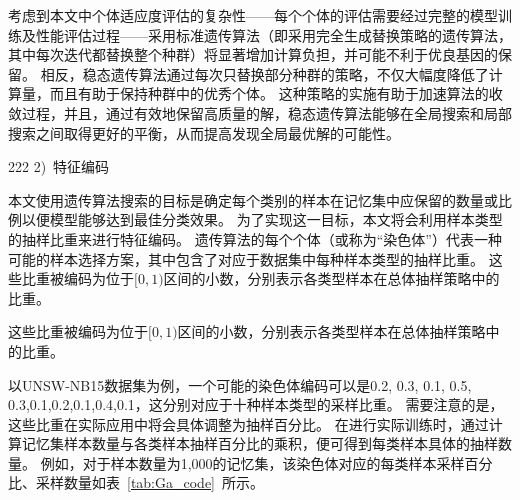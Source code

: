 考虑到本文中个体适应度评估的复杂性——每个个体的评估需要经过完整的模型训练及性能评估过程——采用标准遗传算法（即采用完全生成替换策略的遗传算法，其中每次迭代都替换整个种群）将显著增加计算负担，并可能不利于优良基因的保留。
相反，稳态遗传算法通过每次只替换部分种群的策略，不仅大幅度降低了计算量，而且有助于保持种群中的优秀个体。
这种策略的实施有助于加速算法的收敛过程，并且，通过有效地保留高质量的解，稳态遗传算法能够在全局搜索和局部搜索之间取得更好的平衡，从而提高发现全局最优解的可能性。\par
                                                                                     222
2)~特征编码\par
本文使用遗传算法搜索的目标是确定每个类别的样本在记忆集中应保留的数量或比例以便模型能够达到最佳分类效果。
为了实现这一目标，本文将会利用样本类型的抽样比重来进行特征编码。
遗传算法的每个个体（或称为“染色体”）代表一种可能的样本选择方案，其中包含了对应于数据集中每种样本类型的抽样比重。
这些比重被编码为位于$[0,1)$区间的小数，分别表示各类型样本在总体抽样策略中的比重。\par
这些比重被编码为位于$[0,1)$区间的小数，分别表示各类型样本在总体抽样策略中的比重。\par
以UNSW-NB15数据集为例，一个可能的染色体编码可以是{0.2, 0.3, 0.1, 0.5, 0.3,0.1,0.2,0.1,0.4,0.1}，这分别对应于十种样本类型的采样比重。
需要注意的是，这些比重在实际应用中将会具体调整为抽样百分比。
在进行实际训练时，通过计算记忆集样本数量与各类样本抽样百分比的乘积，便可得到每类样本具体的抽样数量。
例如，对于样本数量为1,000的记忆集，该染色体对应的每类样本采样百分比、采样数量如表~\ref{tab:Ga_code}~所示。\par
